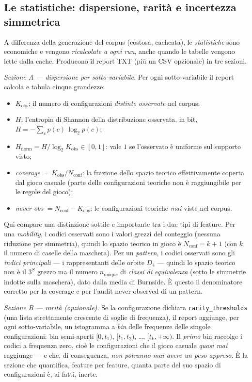 \subsection{Le statistiche: dispersione, rarità e incertezza simmetrica}

A differenza della generazione del corpus (costosa, cacheata), le
\emph{statistiche} sono economiche e vengono \emph{ricalcolate a ogni run},
anche quando le tabelle vengono lette dalla cache. Producono il report TXT
(più un CSV opzionale) in tre sezioni.

\emph{Sezione A — dispersione per sotto-variabile.} Per ogni sotto-variabile
il report calcola e tabula cinque grandezze:

\begin{itemize}
  \item $K_{\text{obs}}$: il numero di configurazioni \emph{distinte
        osservate} nel corpus;
  \item $H$: l'entropia di Shannon della distribuzione osservata, in bit,
        $H = -\sum_c p(c)\,\log_2 p(c)$;
  \item $H_{\text{norm}} = H / \log_2 K_{\text{obs}} \in [0,1]$: vale $1$ se
        l'osservato è uniforme sul supporto visto;
  \item \emph{coverage} $= K_{\text{obs}} / N_{\text{conf}}$: la frazione
        dello spazio teorico effettivamente coperta dal gioco casuale (parte
        delle configurazioni teoriche non è raggiungibile per le regole del
        gioco);
  \item \emph{never-obs} $= N_{\text{conf}} - K_{\text{obs}}$: le
        configurazioni teoriche \emph{mai} viste nel corpus.
\end{itemize}

Qui compare una distinzione sottile e importante tra i due tipi di feature.
Per una \emph{mobility}, i codici osservati sono i valori grezzi del conteggio
(nessuna riduzione per simmetria), quindi lo spazio teorico in gioco è
$N_{\text{conf}} = k+1$ (con $k$ il numero di caselle della maschera). Per un
\emph{pattern}, i codici osservati sono gli \emph{indici principali} — i
rappresentanti delle orbite $D_4$ — quindi lo spazio teorico non è il $3^{S}$
grezzo ma il numero $n_{\text{unique}}$ di \emph{classi di equivalenza}
(sotto le simmetrie indotte sulla maschera), dato dalla media di Burnside.
È questo il denominatore corretto per la coverage e per l'audit
never-observed di un pattern.

\emph{Sezione B — rarità (opzionale).} Se la configurazione dichiara
\texttt{rarity\_thresholds} (una lista strettamente crescente di soglie di
frequenza), il report aggiunge, per ogni sotto-variabile, un istogramma a
\emph{bin} delle frequenze delle singole configurazioni: bin semi-aperti
$[0, t_1)$, $[t_1, t_2)$, \ldots, $[t_k, +\infty)$. Il \emph{primo} bin
raccolge i codici a frequenza zero, cioè le configurazioni che il gioco
casuale \emph{quasi mai} raggiunge — e che, di conseguenza,
\emph{non potranno mai avere un peso appreso}. È la sezione che quantifica,
feature per feature, quanta parte del suo spazio di configurazioni è, ai
fatti, inerte.


